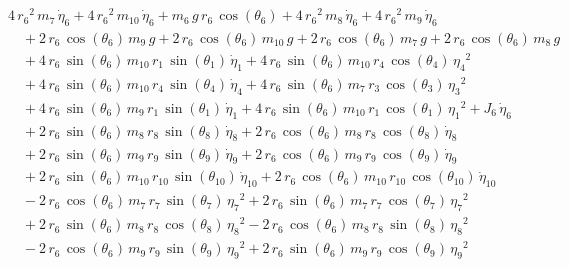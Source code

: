 \begin{eqnarray*} && 4\,{r_{6}}^2\,m_{7}\,{\dot{\eta}_{6}} + 4\,{r_{6}
}^2\,m_{10}\,{\dot{\eta}_{6}} + m_{6}\,g\,r_{6}\,\cos({\theta_{6}}) + 
4\,{r_{6}}^2\,m_{8}\,{\dot{\eta}_{6}} + 4\,{r_{6}}^2\,m_{9}\,{
\dot{\eta}_{6}} \\ &&\quad\mbox{} + 2\,r_{6}\,\cos({\theta_{6}})\,m_{9
}\,g + 2\,r_{6}\,\cos({\theta_{6}})\,m_{10}\,g + 2\,r_{6}\,\cos({
\theta_{6}})\,m_{7}\,g + 2\,r_{6}\,\cos({\theta_{6}})\,m_{8}\,g
 \\ &&\quad\mbox{} + 4\,r_{6}\,\sin({\theta_{6}})\,m_{10}\,r_{1}\,\sin
({\theta_{1}})\,{\dot{\eta}_{1}} + 4\,r_{6}\,\sin({\theta_{6}})\,m_{10
}\,r_{4}\,\cos({\theta_{4}})\,{{\eta_{4}}}^2 \\ &&\quad\mbox{} + 4\,r
_{6}\,\sin({\theta_{6}})\,m_{10}\,r_{4}\,\sin({\theta_{4}})\,{
\dot{\eta}_{4}} + 4\,r_{6}\,\sin({\theta_{6}})\,m_{7}\,r_{3}\,\cos({
\theta_{3}})\,{{\eta_{3}}}^2 \\ &&\quad\mbox{} + 4\,r_{6}\,\sin({
\theta_{6}})\,m_{9}\,r_{1}\,\sin({\theta_{1}})\,{\dot{\eta}_{1}} + 4\,
r_{6}\,\sin({\theta_{6}})\,m_{10}\,r_{1}\,\cos({\theta_{1}})\,{{\eta_{
1}}}^2 + J_{6}\,{\dot{\eta}_{6}} \\ &&\quad\mbox{} + 2\,r_{6}\,\sin({
\theta_{6}})\,m_{8}\,r_{8}\,\sin({\theta_{8}})\,{\dot{\eta}_{8}} + 2\,
r_{6}\,\cos({\theta_{6}})\,m_{8}\,r_{8}\,\cos({\theta_{8}})\,{
\dot{\eta}_{8}} \\ &&\quad\mbox{} + 2\,r_{6}\,\sin({\theta_{6}})\,m_{9
}\,r_{9}\,\sin({\theta_{9}})\,{\dot{\eta}_{9}} + 2\,r_{6}\,\cos({
\theta_{6}})\,m_{9}\,r_{9}\,\cos({\theta_{9}})\,{\dot{\eta}_{9}}
 \\ &&\quad\mbox{} + 2\,r_{6}\,\sin({\theta_{6}})\,m_{10}\,r_{10}\,
\sin({\theta_{10}})\,{\dot{\eta}_{10}} + 2\,r_{6}\,\cos({\theta_{6}})
\,m_{10}\,r_{10}\,\cos({\theta_{10}})\,{\dot{\eta}_{10}}
 \\ &&\quad\mbox{} - 2\,r_{6}\,\cos({\theta_{6}})\,m_{7}\,r_{7}\,\sin(
{\theta_{7}})\,{{\eta_{7}}}^2 + 2\,r_{6}\,\sin({\theta_{6}})\,m_{7}\,r
_{7}\,\cos({\theta_{7}})\,{{\eta_{7}}}^2 \\ &&\quad\mbox{} + 2\,r_{6}
\,\sin({\theta_{6}})\,m_{8}\,r_{8}\,\cos({\theta_{8}})\,{{\eta_{8}}}^2
 - 2\,r_{6}\,\cos({\theta_{6}})\,m_{8}\,r_{8}\,\sin({\theta_{8}})\,{{
\eta_{8}}}^2 \\ &&\quad\mbox{} - 2\,r_{6}\,\cos({\theta_{6}})\,m_{9}\,
r_{9}\,\sin({\theta_{9}})\,{{\eta_{9}}}^2 + 2\,r_{6}\,\sin({\theta_{6}
})\,m_{9}\,r_{9}\,\cos({\theta_{9}})\,{{\eta_{9}}}^2 \\ &&\quad\mbox{}

\end{eqnarray*}

